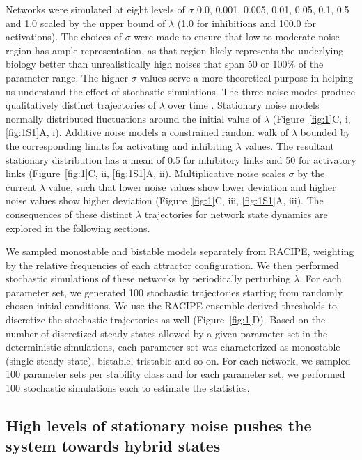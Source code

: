 \documentclass[11pt]{article}
\begin{document}
Networks were simulated at eight levels of $\sigma$ 0.0, 0.001, 0.005, 0.01, 0.05, 0.1, 0.5 and 1.0 scaled by the upper bound of $\lambda$ (1.0 for inhibitions and 100.0 for activations). The choices of $\sigma$ were made to ensure that low to moderate noise region has ample representation, as that region likely represents the underlying biology better than unrealistically high noises that span 50 or 100\% of the parameter range. The higher $\sigma$ values serve a more theoretical purpose in helping us understand the effect of stochastic simulations. The three noise modes produce qualitatively distinct trajectories of $\lambda$ over time . Stationary noise models normally distributed fluctuations around the initial value of $\lambda$ (Figure~\ref{fig:1}C, i, \ref{fig:1S1}A, i). Additive noise models a constrained random walk of $\lambda$ bounded by the corresponding limits for activating and inhibiting $\lambda$ values. The resultant stationary distribution has a mean of 0.5 for inhibitory links and 50 for activatory links (Figure~\ref{fig:1}C, ii, \ref{fig:1S1}A, ii). Multiplicative noise scales $\sigma$ by the current $\lambda$ value, such that lower noise values show lower deviation and higher noise values show higher deviation (Figure~\ref{fig:1}C, iii, \ref{fig:1S1}A, iii). The consequences of these distinct $\lambda$ trajectories for network state dynamics are explored in the following sections.


We sampled monostable and bistable models separately from RACIPE, weighting by the relative frequencies of each attractor configuration. We then performed stochastic simulations of these networks by periodically perturbing $\lambda$. For each parameter set, we generated 100 stochastic trajectories starting from randomly chosen initial conditions. We use the RACIPE ensemble-derived thresholds to discretize the stochastic trajectories as well (Figure~\ref{fig:1}D). Based on the number of discretized steady states allowed by a given parameter set in the deterministic simulations, each parameter set was characterized as monostable (single steady state), bistable, tristable and so on. For each network, we sampled 100 parameter sets per stability class and for each parameter set, we performed 100 stochastic simulations each to estimate the statistics. 



\subsection{High levels of stationary noise pushes the system towards hybrid states}
\end{document}
